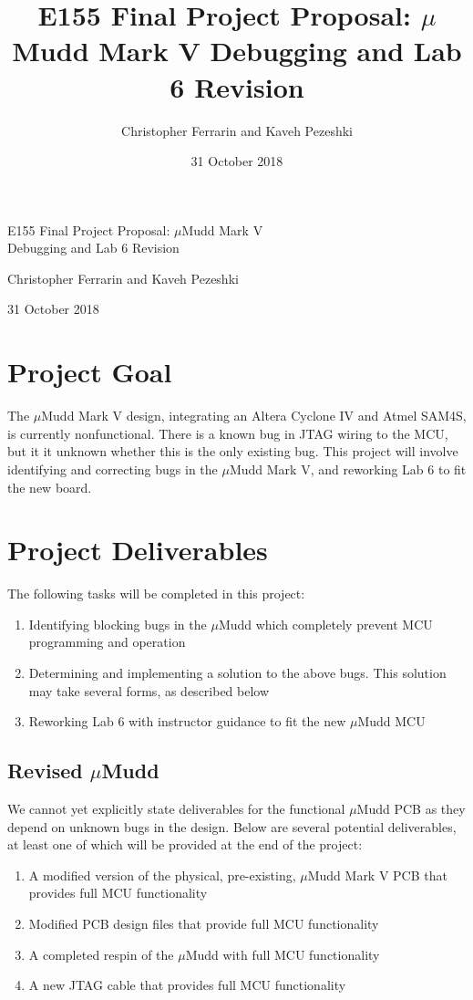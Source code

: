 \documentclass[12pt]{article}
\title{E155 Final Project Proposal: $\mu$Mudd Mark V Debugging and Lab 6 Revision}
\author{Christopher Ferrarin and Kaveh Pezeshki}
\date{31 October 2018}
\begin{document}
	\begin{LARGE}
	\noindent
		E155 
		Final 
		Project 
		Proposal: 
		$\mu$Mudd 
		Mark V \\
		Debugging 
		and 
		Lab 
		6 
		Revision
	\end{LARGE}

	\vspace{0.2cm}
	
	\begin{large}
	Christopher Ferrarin and Kaveh Pezeshki
	
	31 October 2018
	\end{large}


\section{Project Goal}
The $\mu$Mudd Mark V design, integrating an Altera Cyclone IV and Atmel SAM4S, is currently nonfunctional. There is a known bug in JTAG wiring to the MCU, but it it unknown whether this is the only existing bug. This project will involve identifying and correcting bugs in the $\mu$Mudd Mark V, and reworking Lab 6 to fit the new board.

\section{Project Deliverables}

The following tasks will be completed in this project:

\begin{enumerate}
	\item Identifying blocking bugs in the $\mu$Mudd which completely prevent MCU programming and operation
	\item Determining and implementing a solution to the above bugs. This solution may take several forms, as described below
	\item Reworking Lab 6 with instructor guidance to fit the new $\mu$Mudd MCU
\end{enumerate}

\subsection{Revised $\mu$Mudd}

We cannot yet explicitly state deliverables for the functional $\mu$Mudd PCB as they depend on unknown bugs in the design. Below are several potential deliverables, at least one of which will be provided at the end of the project:
\begin{enumerate}
	\item A modified version of the physical, pre-existing, $\mu$Mudd Mark V PCB that provides full MCU functionality
	\item Modified PCB design files that provide full MCU functionality
	\item A completed respin of the $\mu$Mudd with full MCU functionality
	\item A new JTAG cable that provides full MCU functionality
\end{enumerate}
\end{document}
